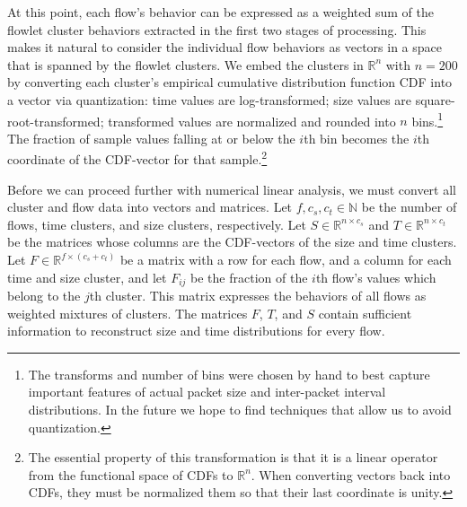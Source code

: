 \documentclass[conference]{IEEEtran}
\newcommand{\caps}[1]{{\small{#1}}}
\newcommand{\R}{\mathbb{R}}
\newcommand{\N}{\mathbb{N}}
\begin{document}
At this point, each flow's behavior can be expressed as a weighted sum of the flowlet cluster behaviors extracted in the first two stages of processing. This makes it natural to consider the individual flow behaviors as vectors in a space that is spanned by the flowlet clusters. We embed the clusters in $\R^{n}$ with $n=200$ by converting each cluster's empirical cumulative distribution function \caps{CDF} into a vector via quantization: time values are log-transformed; size values are square-root-transformed; transformed values are normalized and rounded into $n$ bins.\footnote{The transforms and number of bins were chosen by hand to best capture important features of actual packet size and inter-packet interval distributions. In the future we hope to find techniques that allow us to avoid quantization.} The fraction of sample values falling at or below the $i$th bin becomes the $i$th coordinate of the \caps{CDF}-vector for that sample.\footnote{The essential property of this transformation is that it is a linear operator from the functional space of {\scriptsize{CDF}}s to $\R^n$. When converting vectors back into {\scriptsize{CDF}}s, they must be normalized them so that their last coordinate is unity.}


Before we can proceed further with numerical linear analysis, we must convert all cluster and flow data into vectors and matrices.
Let $f,c_s,c_t \in \N$ be the number of flows, time clusters, and size clusters, respectively.
Let $S \in \R^{n \times c_s}$ and $T \in \R^{n \times c_t}$ be the matrices whose columns are the \caps{CDF}-vectors of the size and time clusters.
 Let $F \in \R^{f \times (c_s+c_t)}$ be a matrix with a row for each flow, and a column for each time and size cluster, and let $F_{ij}$ be the fraction of the $i$th flow's values which belong to the $j$th cluster. This matrix expresses the behaviors of all flows as weighted mixtures of clusters.
The matrices $F$, $T$, and $S$ contain sufficient information to reconstruct size and time distributions for every flow.
\end{document}

